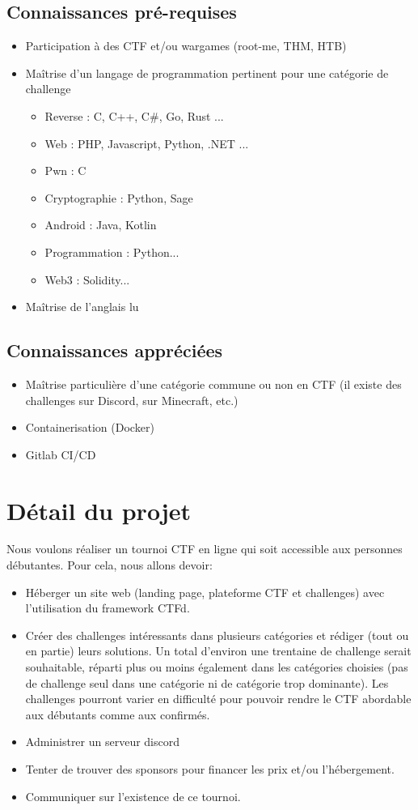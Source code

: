 \documentclass[12pt]{article}
\begin{document}
    \subsection{Connaissances pré-requises}
	\begin{itemize}
		\item Participation à des CTF et/ou wargames (root-me, THM, HTB)
		\item Maîtrise d'un langage de programmation pertinent pour une catégorie de challenge 
		\begin{itemize}
			\item Reverse :  C, C++, C#, Go, Rust ...
			\item Web : PHP, Javascript, Python, .NET ...
			\item Pwn : C
			\item Cryptographie : Python, Sage
			\item Android : Java, Kotlin
			\item Programmation : Python...
			\item Web3 : Solidity...
		\end{itemize}
		\item Maîtrise de l'anglais lu
	\end{itemize}
	
	\subsection{Connaissances appréciées}
	\begin{itemize}
		\item Maîtrise particulière d'une catégorie commune ou non en CTF (il existe des challenges sur Discord, sur Minecraft, etc.)
		\item Containerisation (Docker)
		\item Gitlab CI/CD
	\end{itemize}

    \section{Détail du projet}
    Nous voulons réaliser un tournoi CTF en ligne qui soit accessible aux personnes débutantes. Pour cela, nous allons devoir:
    \begin{itemize}
        \item{Héberger un site web (landing page, plateforme CTF et challenges) avec l’utilisation du framework CTFd.}
        \item{Créer des challenges intéressants dans plusieurs catégories et rédiger (tout ou en partie) leurs solutions. Un total d’environ une trentaine de challenge serait souhaitable, réparti plus ou moins également dans les catégories choisies (pas de challenge seul dans une catégorie ni de catégorie trop dominante). Les challenges pourront varier en difficulté pour pouvoir rendre le CTF abordable aux débutants comme aux confirmés.}
        \item{Administrer un serveur discord}
        \item{Tenter de trouver des sponsors pour financer les prix et/ou l’hébergement.}
        \item{Communiquer sur l’existence de ce tournoi.}
    \end{itemize}
\end{document}
